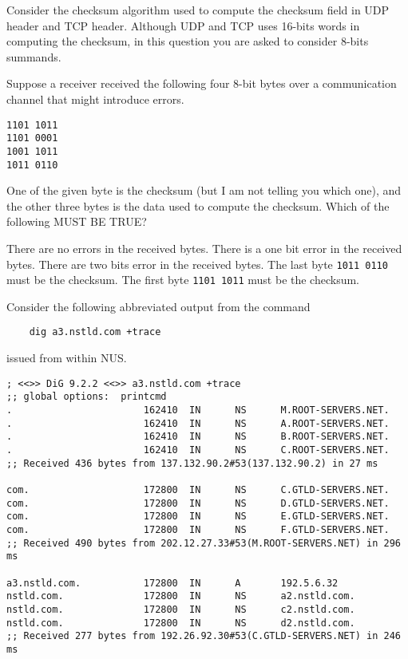\documentclass[a4paper,11pt]{exam}
\begin{document}
\begin{questions}
\question
Consider the checksum algorithm used to compute the checksum field in UDP   header and TCP header.  Although UDP and TCP uses 16-bits words in computing the checksum, in this  question you are asked to consider 8-bits summands.

Suppose a receiver received the following four 8-bit bytes over a           communication channel that might introduce errors.
\begin{verbatim}
1101 1011
1101 0001
1001 1011
1011 0110
\end{verbatim}
One of the given byte is the checksum (but I am not telling you which one), and the other three bytes is the data used to compute the checksum.  Which of the         following MUST BE TRUE?
								          \begin{choices} 
\choice There are no errors in the received bytes.
\choice There is a one bit error in the received bytes.
\choice There are two bits error in the received bytes.
\choice The last byte \texttt{1011 0110} must be the checksum.
\choice The first byte \texttt{1101 1011} must be the checksum.
\end{choices}

\question
Consider the following abbreviated output from the command
\begin{verbatim}
    dig a3.nstld.com +trace
\end{verbatim}
    issued from within NUS. 
\begin{verbatim}
; <<>> DiG 9.2.2 <<>> a3.nstld.com +trace
;; global options:  printcmd
.                       162410  IN      NS      M.ROOT-SERVERS.NET.
.                       162410  IN      NS      A.ROOT-SERVERS.NET.
.                       162410  IN      NS      B.ROOT-SERVERS.NET.
.                       162410  IN      NS      C.ROOT-SERVERS.NET.
;; Received 436 bytes from 137.132.90.2#53(137.132.90.2) in 27 ms

com.                    172800  IN      NS      C.GTLD-SERVERS.NET.
com.                    172800  IN      NS      D.GTLD-SERVERS.NET.
com.                    172800  IN      NS      E.GTLD-SERVERS.NET.
com.                    172800  IN      NS      F.GTLD-SERVERS.NET.
;; Received 490 bytes from 202.12.27.33#53(M.ROOT-SERVERS.NET) in 296 ms

a3.nstld.com.           172800  IN      A       192.5.6.32
nstld.com.              172800  IN      NS      a2.nstld.com.
nstld.com.              172800  IN      NS      c2.nstld.com.
nstld.com.              172800  IN      NS      d2.nstld.com.
;; Received 277 bytes from 192.26.92.30#53(C.GTLD-SERVERS.NET) in 246 ms
\end{verbatim}
	

\end{questions}
\end{document}
